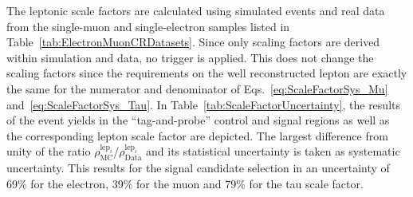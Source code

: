 The leptonic scale factors are calculated using simulated \Zlep events and real data from the single-muon and single-electron samples listed in Table~\ref{tab:ElectronMuonCRDatasets}.
Since only scaling factors are derived within simulation and data, no trigger is applied.
This does not change the scaling factors since the requirements on the well reconstructed lepton are exactly the same for the numerator and denominator of Eqs.~\eqref{eq:ScaleFactorSys_Mu} and~\eqref{eq:ScaleFactorSys_Tau}.
In Table~\ref{tab:ScaleFactorUncertainty}, the results of the event yields in the ``tag-and-probe'' control and signal regions as well as the corresponding lepton scale factor are depicted.
The largest difference from unity of the ratio $\rho^{\text{lep}_i}_{\text{MC}}$/$\rho^{\text{lep}_i}_{\text{Data}}$ and its statistical uncertainty is taken as systematic uncertainty. 
This results for the signal candidate selection in an uncertainty of 69\% for the electron, 39\% for the muon and 79\% for the tau scale factor.

